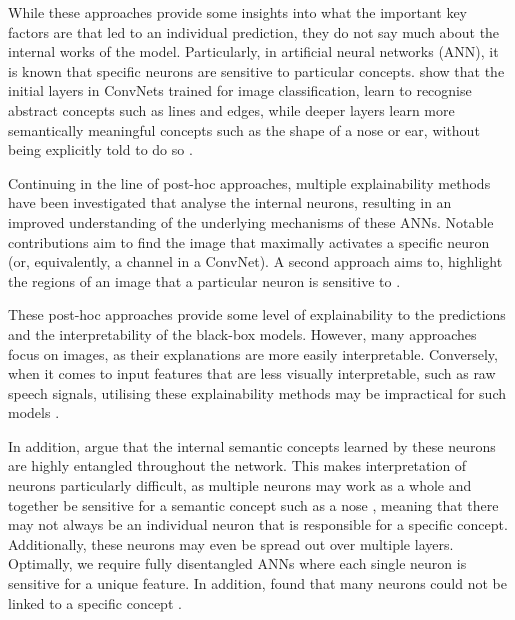 While these approaches provide some insights into what the important key factors are that led to an individual prediction, they do not say much about the internal works of the model. Particularly, in artificial neural networks (ANN), it is known that specific neurons are sensitive to particular concepts. \citeauthor{zeilerVisualizingUnderstandingConvolutional2013} show that the initial layers in ConvNets trained for image classification, learn to recognise abstract concepts such as lines and edges, while deeper layers learn more semantically meaningful concepts such as the shape of a nose or ear, without being explicitly told to do so \citep{zeilerVisualizingUnderstandingConvolutional2013}.


Continuing in the line of post-hoc approaches, multiple explainability methods have been investigated that analyse the internal neurons, resulting in an improved understanding of the underlying mechanisms of these ANNs. Notable contributions aim to find the image that maximally activates a specific neuron \citep{simonyanDeepConvolutionalNetworks2014} (or, equivalently, a channel in a ConvNet). A second approach aims to, highlight the regions of an image that a particular neuron is sensitive to \citep{zeilerVisualizingUnderstandingConvolutional2013}.

These post-hoc approaches provide some level of explainability to the predictions and the interpretability of the black-box models. However, many approaches focus on images, as their explanations are more easily interpretable. Conversely, when it comes to input features that are less visually interpretable, such as raw speech signals, utilising these explainability methods may be impractical for such models \citep{krugAnalyzingVisualizingDeep2021}.

In addition, \cite{bauNetworkDissectionQuantifying2017} argue that the internal semantic concepts learned by these neurons are highly entangled throughout the network. This makes interpretation of neurons particularly difficult, as multiple neurons may work as a whole and together be sensitive for a semantic concept such as a nose \citep{molnarInterpretableMachineLearning2022}, meaning that there may not always be an individual neuron that is responsible for a specific concept. Additionally, these neurons may even be spread out over multiple layers.  Optimally, we require fully disentangled ANNs where each single neuron is sensitive for a unique feature. In addition, \citeauthor{bauNetworkDissectionQuantifying2017} found that many neurons could not be linked to a specific concept \citep{molnarInterpretableMachineLearning2022}.

